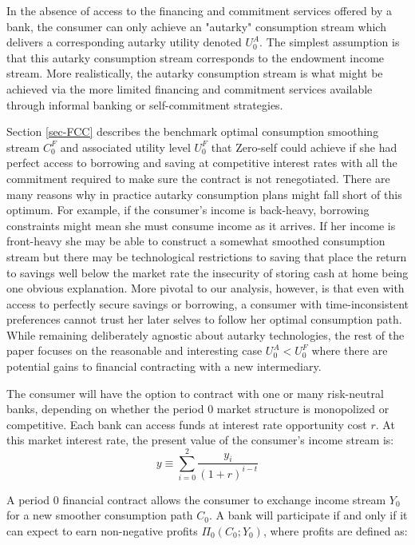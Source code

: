 \documentclass[11pt,english]{article}
\theoremstyle{plain}
\theoremstyle{definition}
\begin{document}
In the absence of access to the financing and commitment services
offered by a bank, the consumer can only achieve an "autarky" consumption
stream which delivers a corresponding autarky utility denoted $U_{0}^{A}$.
The simplest assumption is that this autarky consumption stream corresponds
to the endowment income stream. More realistically, the autarky consumption
stream is what might be achieved via the more limited financing and
commitment services available through informal banking or self-commitment
strategies.

Section \ref{sec-FCC} describes the benchmark optimal consumption
smoothing stream $C_{0}^{F}$ and associated utility level $U_{0}^{F}$
that Zero-self could achieve if she had perfect access to borrowing
and saving at competitive interest rates with all the commitment
required to make sure the contract is not renegotiated. There are
many reasons why in practice autarky consumption plans might fall
short of this optimum. For example, if the consumer's income is back-heavy,
borrowing constraints might mean she must consume income as it arrives.
If her income is front-heavy she may be able to construct a somewhat
smoothed consumption stream but there may be technological restrictions
to saving that place the return to savings well below the market rate
\textendash{} the insecurity of storing cash at home being one obvious
explanation. More pivotal to our analysis, however, is that even with
access to perfectly secure savings or borrowing, a consumer with time-inconsistent
preferences cannot trust her later selves to follow her optimal consumption
path. While remaining deliberately agnostic about autarky technologies,
the rest of the paper focuses on the reasonable and interesting case
$U_{0}^{A}<U_{0}^{F}$ where there are potential gains to financial
contracting with a new intermediary.

The consumer will have the option to contract with one or many risk-neutral
banks, depending on whether the period 0 market structure is monopolized
or competitive. Each bank can access funds at interest rate opportunity
cost $r$. At this market interest rate, the present value of the
consumer's income stream is: 
\begin{equation}
y\equiv\sum\limits _{i=0}^{2}\frac{y_{i}}{\left(1+r\right)^{i-t}}
\end{equation}

A period 0 financial contract allows the consumer to exchange income
stream $Y_{0}$ for a new smoother consumption path $C_{0}$. A bank
will participate if and only if it can expect to earn non-negative
profits $\Pi_{0}(C_{0};Y_{0})$, where profits are defined as:
\end{document}
